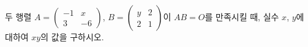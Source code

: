 \hspace*{2mm}\begin{minipage}[t]{\dimexpr\linewidth-2mm\relax}\vspace{0pt}
두 행렬 $A=\begin{pmatrix} -1 & x \\ 3 & -6 \end{pmatrix}$, $B=\begin{pmatrix} y & 2 \\ 2 & 1 \end{pmatrix}$이 $AB=O$를 만족시킬 때, 실수 $x$, $y$에 대하여 $xy$의 값을 구하시오.\end{minipage}
